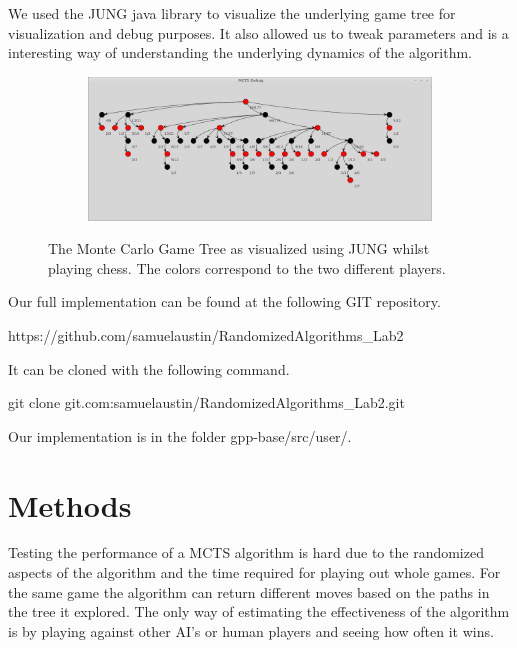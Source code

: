 \documentclass[compressed,final,notitlepage,narroweqnarray,inline,twoside,]{ieee}
\begin{document}
We used the JUNG java library \cite{JUNG} to visualize the underlying game tree for visualization and debug purposes. It also allowed us to tweak parameters and is a interesting way of understanding the underlying dynamics of the algorithm.

\begin{figure}[ht]
        \centering
        \begin{subfigure}[b]{1\textwidth}
                \includegraphics[width=\textwidth]{../images/mcts_tree}
                \label{fig:gull}
        \end{subfigure}
        \vspace{-20pt}\caption{The Monte Carlo Game Tree as visualized using JUNG whilst playing chess. The colors correspond to the two different players.}\label{fig:2}
\end{figure}

Our full implementation can be found at the following GIT repository.
\begin{framed}
\scriptsize
https://github.com/samuelaustin/RandomizedAlgorithms\_Lab2
\end{framed}
\normalsize
It can be cloned with the following command.
\begin{framed}
\scriptsize
git clone git\@github.com:samuelaustin/RandomizedAlgorithms\_Lab2.git
\end{framed}
\normalsize
Our implementation is in the folder gpp-base/src/user/.

\section{Methods}
Testing the performance of a MCTS algorithm is hard due to the randomized aspects of the algorithm and the time required for playing out whole games. For the same game the algorithm can return different moves based on the paths in the tree it explored. The only way of estimating the effectiveness of the algorithm is by playing against other AI’s or human players and seeing how often it wins.
\end{document}
